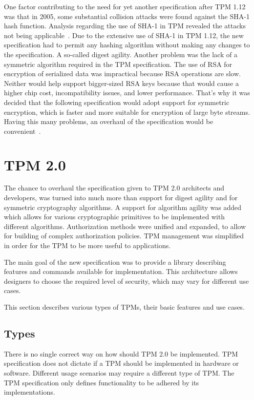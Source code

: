 One factor contributing to the need for yet another specification after TPM 1.12 was that in 2005, some substantial collision attacks were found against the SHA-1 hash function. Analysis regarding the use of SHA-1 in TPM revealed the attacks not being applicable~\cite{tcg_tpm1.12_sha-1_uses}. Due to the extensive use of SHA-1 in TPM 1.12, the new specification had to permit any hashing algorithm without making any changes to the specification. A so-called digest agility. Another problem was the lack of a symmetric algorithm required in the TPM specification. The use of RSA for encryption of serialized data was impractical because RSA operations are slow. Neither would help support bigger-sized RSA keys because that would cause a higher chip cost, incompatibility issues, and lower performance. That's why it was decided that the following specification would adopt support for symmetric encryption, which is faster and more suitable for encryption of large byte streams. Having this many problems, an overhaul of the specification would be convenient~\cite[p.~4]{arthur2015practical}.



\section{TPM 2.0}
The chance to overhaul the specification given to TPM 2.0 architects and developers, was turned into much more than support for digest agility and for symmetric cryptography algorithms. A support for algorithm agility was added which allows for various cryptographic primitives to be implemented with different algorithms. Authorization methods were unified and expanded, to allow for building of complex authorization policies. TPM management was simplified in order for the TPM to be more useful to applications.

The main goal of the new specification was to provide a library describing features and commands available for implementation. This architecture allows designers to choose the required level of security, which may vary for different use cases. 

This section describes various types of TPMs, their basic features and use cases.

\subsection{Types}
There is no single correct way on how should TPM 2.0 be implemented. TPM specification does not dictate if a TPM should be implemented in hardware or software. Different usage scenarios may require a different type of TPM. The TPM specification only defines functionality to be adhered by its implementations. 

